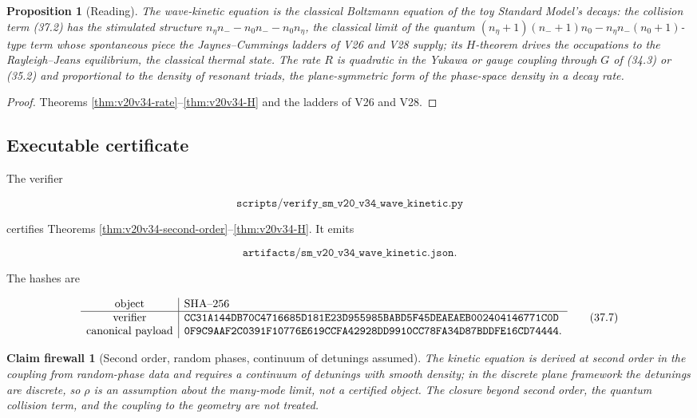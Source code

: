 \documentclass[11pt]{article}
\newtheorem{proposition}[theorem]{Proposition}
\newtheorem{firewall}[theorem]{Claim firewall}
\theoremstyle{remark}
\begin{document}
\begin{proposition}[Reading]
\label{prop:v20v34-reading}
The wave-kinetic equation is the classical Boltzmann equation of
the toy Standard Model's decays: the collision term (37.2) has the
stimulated structure \(n_\eta n_--n_0n_--n_0n_\eta\), the classical
limit of the quantum \((n_\eta+1)(n_-+1)n_0-n_\eta n_-(n_0+1)\)-type term
whose spontaneous piece the Jaynes--Cummings ladders of V26 and V28
supply; its \(H\)-theorem drives the occupations to the
Rayleigh--Jeans equilibrium, the classical thermal state.  The rate
\(R\) is quadratic in the Yukawa or gauge coupling through \(G\) of
(34.3) or (35.2) and proportional to the density of resonant
triads, the plane-symmetric form of the phase-space density in a
decay rate.
\end{proposition}

\begin{proof}
Theorems \ref{thm:v20v34-rate}--\ref{thm:v20v34-H} and the ladders
of V26 and V28.
\end{proof}

\subsection{Executable certificate}

The verifier

\[
 \texttt{scripts/verify\_sm\_v20\_v34\_wave\_kinetic.py}              \tag{37.5}
\]

certifies Theorems \ref{thm:v20v34-second-order}--\ref{thm:v20v34-H}.
It emits

\[
 \texttt{artifacts/sm\_v20\_v34\_wave\_kinetic.json}.                 \tag{37.6}
\]

The hashes are

\[
\begin{array}{c|l}
\hbox{object}&\hbox{SHA--256}\\ \hline
\hbox{verifier}&
\texttt{CC31A144DB70C4716685D181E23D955985BABD5F45DEAEAEB002404146771C0D}\\
\hbox{canonical payload}&
\texttt{0F9C9AAF2C0391F10776E619CCFA42928DD9910CC78FA34D87BDDFE16CD74444}.
\end{array}                                                     \tag{37.7}
\]

\begin{firewall}[Second order, random phases, continuum of detunings assumed]
\label{fire:v20v34}
The kinetic equation is derived at second order in the coupling
from random-phase data and requires a continuum of detunings with
smooth density; in the discrete plane framework the detunings are
discrete, so \(\rho\) is an assumption about the many-mode limit, not
a certified object.  The closure beyond second order, the
quantum collision term, and the coupling to the geometry are not
treated.
\end{firewall}
\end{document}
